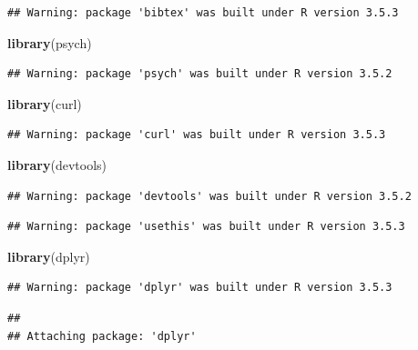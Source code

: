 \documentclass[]{article}
\newenvironment{Shaded}{\begin{snugshade}}{\end{snugshade}}
\newcommand{\KeywordTok}[1]{\textcolor[rgb]{0.13,0.29,0.53}{\textbf{#1}}}
\newcommand{\NormalTok}[1]{#1}
\begin{document}
\begin{verbatim}
## Warning: package 'bibtex' was built under R version 3.5.3
\end{verbatim}

\begin{Shaded}
\begin{Highlighting}[]
  \KeywordTok{library}\NormalTok{(psych)}
\end{Highlighting}
\end{Shaded}

\begin{verbatim}
## Warning: package 'psych' was built under R version 3.5.2
\end{verbatim}

\begin{Shaded}
\begin{Highlighting}[]
  \KeywordTok{library}\NormalTok{(curl)}
\end{Highlighting}
\end{Shaded}

\begin{verbatim}
## Warning: package 'curl' was built under R version 3.5.3
\end{verbatim}

\begin{Shaded}
\begin{Highlighting}[]
  \KeywordTok{library}\NormalTok{(devtools)}
\end{Highlighting}
\end{Shaded}

\begin{verbatim}
## Warning: package 'devtools' was built under R version 3.5.2
\end{verbatim}

\begin{verbatim}
## Warning: package 'usethis' was built under R version 3.5.3
\end{verbatim}

\begin{Shaded}
\begin{Highlighting}[]
  \KeywordTok{library}\NormalTok{(dplyr)}
\end{Highlighting}
\end{Shaded}

\begin{verbatim}
## Warning: package 'dplyr' was built under R version 3.5.3
\end{verbatim}

\begin{verbatim}
## 
## Attaching package: 'dplyr'
\end{verbatim}
\end{document}
